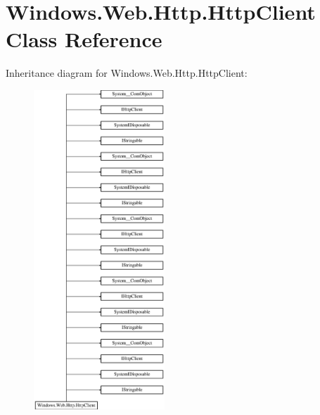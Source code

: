 \hypertarget{class_windows_1_1_web_1_1_http_1_1_http_client}{}\section{Windows.\+Web.\+Http.\+Http\+Client Class Reference}
\label{class_windows_1_1_web_1_1_http_1_1_http_client}
Inheritance diagram for Windows.\+Web.\+Http.\+Http\+Client\+:\begin{figure}[H]
\begin{center}
\leavevmode
\includegraphics[height=12.000000cm]{class_windows_1_1_web_1_1_http_1_1_http_client}
\end{center}
\end{figure}
